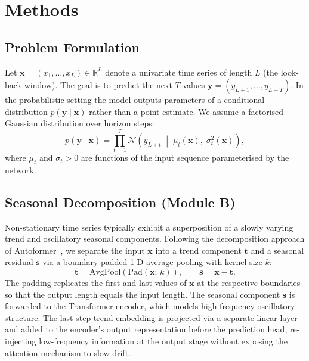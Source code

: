\documentclass[runningheads]{llncs}
\begin{document}
\section{Methods}

\subsection{Problem Formulation}

Let $\mathbf{x} = (x_1, \ldots, x_L) \in \mathbb{R}^{L}$ denote a univariate time
series of length $L$ (the look-back window). The goal is to predict the next
$T$ values $\mathbf{y} = (y_{L+1}, \ldots, y_{L+T})$.
In the probabilistic setting the model outputs parameters of a conditional distribution
$p(\mathbf{y} \mid \mathbf{x})$ rather than a point estimate.
We assume a factorised Gaussian distribution over horizon steps:
\begin{equation}
  p(\mathbf{y} \mid \mathbf{x}) =
  \prod_{t=1}^{T} \mathcal{N}\!\left(y_{L+t} \;\middle|\;
    \mu_t(\mathbf{x}),\;\sigma_t^2(\mathbf{x})\right),
\end{equation}
where $\mu_t$ and $\sigma_t > 0$ are functions of the input sequence parameterised
by the network.

\subsection{Seasonal Decomposition (Module B)}

Non-stationary time series typically exhibit a superposition of a slowly varying
trend and oscillatory seasonal components.
Following the decomposition approach of Autoformer~\cite{wu2021autoformer},
we separate the input $\mathbf{x}$ into a trend component $\mathbf{t}$ and a
seasonal residual $\mathbf{s}$ via a boundary-padded 1-D average pooling with
kernel size $k$:
\begin{equation}
  \mathbf{t} = \mathrm{AvgPool}(\mathrm{Pad}(\mathbf{x};\,k)),
  \qquad \mathbf{s} = \mathbf{x} - \mathbf{t}.
\end{equation}
The padding replicates the first and last values of $\mathbf{x}$ at the respective
boundaries so that the output length equals the input length.
The seasonal component $\mathbf{s}$ is forwarded to the Transformer encoder, which
models high-frequency oscillatory structure.
The last-step trend embedding is projected via a separate linear layer and
added to the encoder's output representation before the prediction head,
re-injecting low-frequency information at the output stage without exposing
the attention mechanism to slow drift.
\end{document}
